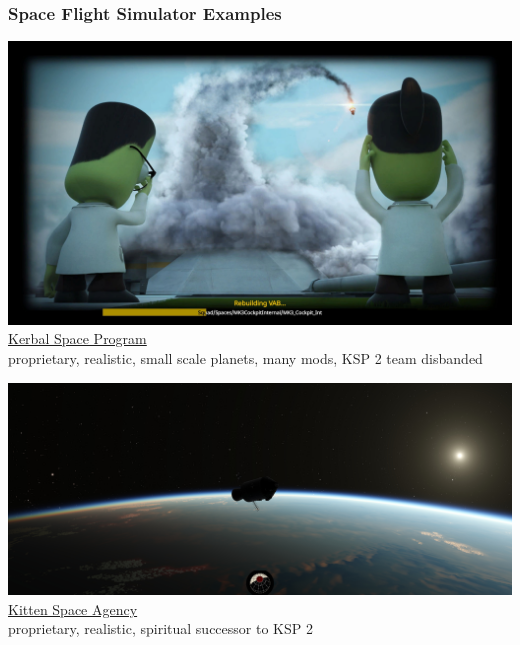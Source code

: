 \documentclass[aspectratio=169,11pt,xcolor=dvipsnames]{beamer}
\begin{document}
\begin{frame}
  \frametitle{Space Flight Simulator Examples}
  \begin{minipage}[t]{0.49\textwidth}
    \begin{center}
      \includegraphics[width=\textwidth]{ksp}\\
      \href{https://www.kerbalspaceprogram.com/}{Kerbal Space Program}\\
      proprietary, realistic, small scale planets, many mods, KSP 2 team disbanded
    \end{center}
  \end{minipage}
  \begin{minipage}[t]{0.49\textwidth}
    \begin{center}
      \includegraphics[width=\textwidth]{ksa}\\
      \href{https://rocketwerkz.com/}{Kitten Space Agency}\\
      proprietary, realistic, spiritual successor to KSP 2
    \end{center}
  \end{minipage}
\end{frame}
\end{document}
